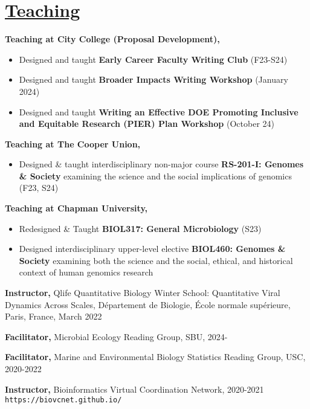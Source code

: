 \documentclass[]{res}
\begin{document}
\begin{resume}
\begin{enumerate}[leftmargin=*]
  \end{enumerate} 


\section{\underline{Teaching}} \vspace{2mm}

{\bf Teaching at City College (Proposal Development),} 
\begin{itemize} \itemsep -2pt
\item Designed and taught {\bf Early Career Faculty Writing Club} (F23-S24)
\item Designed and taught {\bf Broader Impacts Writing Workshop} (January 2024)
\item Designed and taught {\bf Writing an Effective DOE Promoting Inclusive and Equitable Research (PIER) Plan Workshop} (October 24)
\end{itemize}


{\bf Teaching at The Cooper Union,} 
\begin{itemize} \itemsep -2pt
\item Designed \& taught interdisciplinary non-major course {\bf RS-201-I: Genomes \& Society} examining the science and the social implications of genomics (F23, S24)
\end{itemize}

{\bf Teaching at Chapman University,} 
\begin{itemize} \itemsep -2pt
\item Redesigned \& Taught {\bf BIOL317: General Microbiology} (S23)
\item Designed interdisciplinary upper-level elective {\bf BIOL460: Genomes \& Society} examining both the science and the social, ethical, and historical context of human genomics research
\end{itemize}

{\bf Instructor,} Qlife Quantitative Biology Winter School: Quantitative Viral Dynamics Across Scales, D\'{e}partement de Biologie, \'{E}cole normale sup\'{e}rieure, Paris, France, March 2022

{\bf Facilitator,} {Microbial Ecology Reading Group}, SBU, 2024-

{\bf Facilitator,} {Marine and Environmental Biology Statistics Reading Group}, USC, 2020-2022

{\bf Instructor,} Bioinformatics Virtual Coordination Network, 2020-2021\\
\verb|https://biovcnet.github.io/|


\end{resume}
\end{document}

